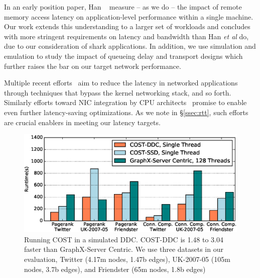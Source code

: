 In an early position paper, Han \etal~\cite{hotnets} measure -- as we do -- the impact of remote memory access latency on application-level performance within a single machine. Our work extends this  understanding to a larger set of workloads and concludes with more stringent requirements on latency and bandwidth than Han {\it et al} do, due to our consideration of shark applications. In addition, we use simulation and emulation to study the impact of queueing delay and transport designs which further raises the bar on our target network performance.


Multiple recent efforts~\cite{farm,mica,herd,ramcloud} aim to reduce the latency in networked applications through techniques that bypass the kernel networking stack, and so forth. %
Similarly efforts toward NIC integration by CPU architects~\cite{cpu-nic} promise to enable even further latency-saving optimizations. As we note in \S\ref{ssec:rtt}, such efforts are crucial enablers in meeting our latency targets. 










\begin{figure}
  \centering
    \includegraphics[width = \columnwidth]{img/benefit.eps} 
  \caption{\small{Running COST in a simulated DDC. COST-DDC is 1.48 to 3.04 faster than GraphX-Server Centric. We use three datasets in our evaluation, Twitter (4.17m nodes, 1.47b edges), UK-2007-05 (105m nodes, 3.7b edges), and Friendster (65m nodes, 1.8b edges)}}
  \label{fig:benefit}
\end{figure}








